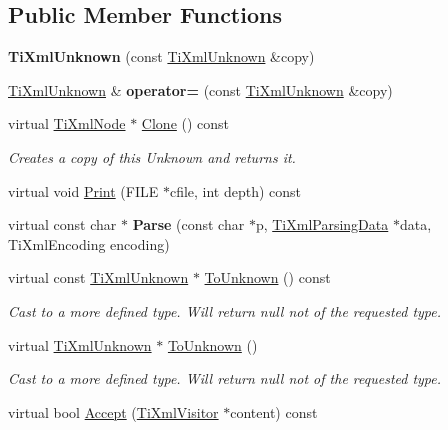 \subsection*{Public Member Functions}
\begin{DoxyCompactItemize}
\item 
\mbox{\label{classTiXmlUnknown_abe798ff4feea31474850c7f0de6bdf5e}} 
{\bfseries Ti\+Xml\+Unknown} (const \hyperlink{classTiXmlUnknown}{Ti\+Xml\+Unknown} \&copy)
\item 
\mbox{\label{classTiXmlUnknown_a60560b5aacb4bdc8b2b5f02f0a99c5c0}} 
\hyperlink{classTiXmlUnknown}{Ti\+Xml\+Unknown} \& {\bfseries operator=} (const \hyperlink{classTiXmlUnknown}{Ti\+Xml\+Unknown} \&copy)
\item 
\mbox{\label{classTiXmlUnknown_a3dea7689de5b1931fd6657992948fde0}} 
virtual \hyperlink{classTiXmlNode}{Ti\+Xml\+Node} $\ast$ \hyperlink{classTiXmlUnknown_a3dea7689de5b1931fd6657992948fde0}{Clone} () const
\begin{DoxyCompactList}\small\item\em Creates a copy of this Unknown and returns it. \end{DoxyCompactList}\item 
virtual void \hyperlink{classTiXmlUnknown_a5793fbc48ab3419783c0e866ca2d334e}{Print} (F\+I\+LE $\ast$cfile, int depth) const
\item 
\mbox{\label{classTiXmlUnknown_aa51c2694e4177b5f0b5429ee5a81b58d}} 
virtual const char $\ast$ {\bfseries Parse} (const char $\ast$p, \hyperlink{classTiXmlParsingData}{Ti\+Xml\+Parsing\+Data} $\ast$data, Ti\+Xml\+Encoding encoding)
\item 
\mbox{\label{classTiXmlUnknown_a0d08dc16fc9ce16140ccaefbc35f6ea6}} 
virtual const \hyperlink{classTiXmlUnknown}{Ti\+Xml\+Unknown} $\ast$ \hyperlink{classTiXmlUnknown_a0d08dc16fc9ce16140ccaefbc35f6ea6}{To\+Unknown} () const
\begin{DoxyCompactList}\small\item\em Cast to a more defined type. Will return null not of the requested type. \end{DoxyCompactList}\item 
\mbox{\label{classTiXmlUnknown_a67c9fd22940e8c47f706a72cdd2e332c}} 
virtual \hyperlink{classTiXmlUnknown}{Ti\+Xml\+Unknown} $\ast$ \hyperlink{classTiXmlUnknown_a67c9fd22940e8c47f706a72cdd2e332c}{To\+Unknown} ()
\begin{DoxyCompactList}\small\item\em Cast to a more defined type. Will return null not of the requested type. \end{DoxyCompactList}\item 
virtual bool \hyperlink{classTiXmlUnknown_aafdf1b2d4f561979c7907bad91004999}{Accept} (\hyperlink{classTiXmlVisitor}{Ti\+Xml\+Visitor} $\ast$content) const
\end{DoxyCompactItemize}
